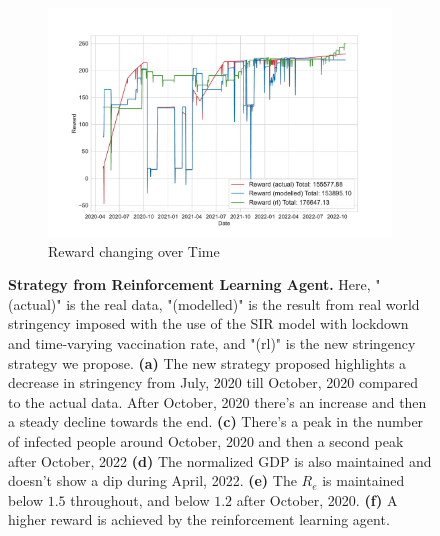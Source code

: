 \documentclass[tikz,fleqn,12pt]{wlscirep}
\begin{document}
\begin{figure}[htbp!]
\begin{subfigure}[t]{0.48\textwidth}
    \includegraphics[width=\linewidth]{images/176647/rl_reward.pdf}
    \caption{Reward changing over Time}
    \label{fig:176647_rl_reward}
  \end{subfigure}
  \caption{\textbf{Strategy from Reinforcement Learning Agent.} Here, "(actual)" is the real data, "(modelled)" is the result from real world stringency imposed with the use of the SIR model with lockdown and time-varying vaccination rate, and "(rl)" is the new stringency strategy we propose. \textbf{(a)} The new strategy proposed highlights a decrease in stringency from July, 2020 till October, 2020 compared to the actual data. After October, 2020 there's an increase and then a steady decline towards the end. \textbf{(c)} There's a peak in the number of infected people around October, 2020 and then a second peak after October, 2022 \textbf{(d)} The normalized GDP is also maintained and doesn't show a dip during April, 2022. \textbf{(e)} The $R_e$ is maintained below $1.5$ throughout, and below $1.2$ after October, 2020. \textbf{(f)} A higher reward is achieved by the reinforcement learning agent.}
  \label{fig:176647_parent}
\end{figure}
\end{document}
